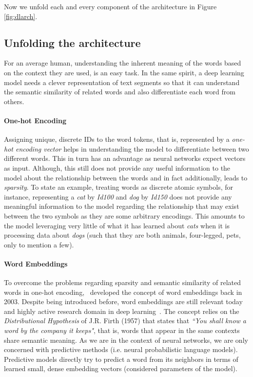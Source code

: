 Now we unfold each and every component of the architecture in Figure \ref{fig:dlarch}. 

\subsection{Unfolding the architecture}\label{section:architecture}

For an average human, understanding the inherent meaning of the words based on the context they are used, is an easy task. In the same spirit, a deep learning model needs a clever representation of text segments so that it can understand the semantic similarity of related words and also differentiate each word from others. 


\paragraph{One-hot Encoding} Assigning unique, discrete IDs to the word tokens, that is, represented by a \emph{one-hot encoding vector} helps in understanding the model to differentiate between two different words. This in turn has an advantage as neural networks expect vectors as input. Although, this still does not provide any useful information to the model about the relationship between the words and in fact additionally, leads to \emph{sparsity}. 
To state an example, treating words as discrete atomic symbols, for instance, representing a \emph{cat} by \emph{Id100} and \emph{dog} by \emph{Id150} does not provide any meaningful information to the model regarding the relationship that may exist between the two symbols as they are some arbitrary encodings. This amounts to the model leveraging very little of what it has learned about \emph{cats} when it is processing data about \emph{dogs} (such that they are both animals, four-legged, pets, only to mention a few).

\paragraph{Word Embeddings} To overcome the problems regarding sparsity and semantic similarity of related words in one-hot encoding,~\cite{bengio2003neural} developed the concept of word embeddings back in 2003. Despite being introduced before, word embeddings are still relevant today and highly active research domain in deep learning~\cite{bojanowski2017enriching, joulin2017bag, joulin2016fasttext, Peters:2018}. The concept relies on the \emph{Distributional Hypothesis} of J.R. Firth (1957) that states that \emph{``You shall know a word by the company it keeps"}, that is, words that appear in the same contexts share semantic meaning. As we are in the context of neural networks, we are only concerned with predictive methods (i.e. neural probabilistic language models). Predictive models directly try to predict a word from its neighbors in terms of learned small, dense embedding vectors (considered parameters of the model).



